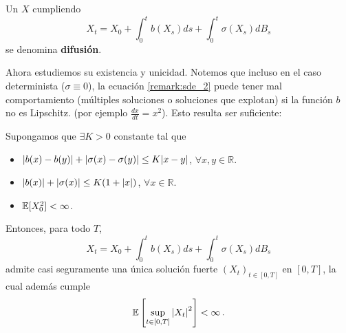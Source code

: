 \begin{remark}
\label{remark:sde_2}
Un $X$ cumpliendo 
$$X_t = X_0 + \int_{0}^{t} b(X_s) ds  + \int_{0}^{t} \sigma (X_s) dB_s $$ 
se denomina \textbf{difusión}.
\end{remark}

\newp Ahora estudiemos su existencia y unicidad. Notemos que incluso en el caso determinista ($\sigma \equiv 0$), la ecuación \ref{remark:sde_2} puede tener mal comportamiento (múltiples soluciones o soluciones que explotan) si la función $b$ no es Lipschitz. (por ejemplo $\frac{dx}{dt} = x^2$). Esto resulta ser suficiente:

\begin{theorem}
Supongamos que $\exists K >0$ constante tal que 
\begin{itemize}
    \item $\abs{b(x) - b(y)} + \abs{\sigma(x)- \sigma(y)} \le  K \abs{x-y}$, $\forall x,y \in \mathbb{R}$. 
    \item $\abs{b(x)} + \abs{\sigma(x)} \le K(1+\abs{x})$, $\forall x \in \mathbb{R}$. 
    \item $\mathbb{E}[X_{0}^{2}] < \infty$. 
\end{itemize}
Entonces, para todo $T$,
$$X_t = X_0 + \int_{0}^{t} b(X_s) ds  + \int_{0}^{t} \sigma (X_s) dB_s $$ 
admite casi seguramente una única solución fuerte $(X_t)_{t \in [0,T]}$ en $[0,T]$, la cual además cumple 
\begin{equation*}
    \mathbb{E} \left[ \sup_{t \in [0,T]} \abs{X_t}^2 \right] < \infty \,.
\end{equation*}
\end{theorem}

